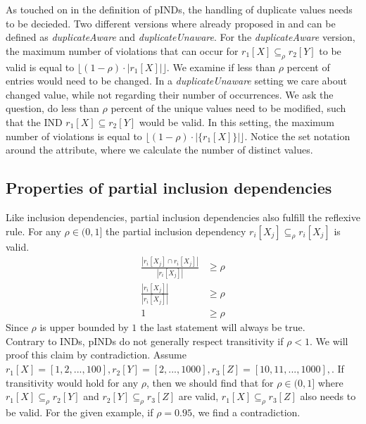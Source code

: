 As touched on in the definition of pINDs, the handling of duplicate values needs to be decieded. Two different versions where already proposed in \cite{bauckmann2006efficiently} and can be defined as \textit{duplicateAware} and \textit{duplicateUnaware}.
For the \textit{duplicateAware} version, the maximum number of violations that can occur for $r_1[X] \subseteq_{\rho} r_2[Y]$ to be valid is equal to $\lfloor (1-\rho) \cdot |r_1[X]| \rfloor$. We examine if less than $\rho$ percent of entries would need to be changed. In a \textit{duplicateUnaware} setting we care about changed value, while not regarding their number of occurrences. We ask the question, do less than $\rho$ percent of the unique values need to be modified, such that the IND $r_1[X] \subseteq r_2[Y]$ would be valid. In this setting, the maximum number of violations is equal to $\lfloor(1-\rho) \cdot |\{r_1[X]\}| \rfloor$. Notice the set notation around the attribute, where we calculate the number of distinct values. \\

\subsection{Properties of partial inclusion dependencies}
Like inclusion dependencies, partial inclusion dependencies also fulfill the reflexive rule. For any $\rho \in (0, 1]$ the partial inclusion dependency $r_i[X_j] \subseteq_{\rho} r_i[X_j]$ is valid.
\begin{align*}
    \frac{|r_i[X_j] \cap r_i[X_j]|}
        {|r_i[X_j]|} & \geq \rho \\
    \frac{|r_i[X_j]|}
        {|r_i[X_j]|} & \geq \rho \\
        1 & \geq \rho
 \end{align*}
 Since $\rho$ is upper bounded by $1$ the last statement will always be true. \\

 Contrary to INDs, pINDs do not generally respect transitivity if $\rho < 1$. We will proof this claim by contradiction. Assume $r_1[X] = [1, 2, ..., 100], r_2[Y] = [2, ..., 1000], r_3[Z] = [10, 11, ..., 1000],$. If transitivity would hold for any $\rho$, then we should find that for $\rho \in (0, 1]$ where $r_1[X] \subseteq_\rho r_2[Y]$ and $ r_2[Y] \subseteq_\rho  r_3[Z]$ are valid, $ r_1[X] \subseteq_\rho  r_3[Z]$ also needs to be valid. For the given example, if $\rho = 0.95$, we find a contradiction. \\

